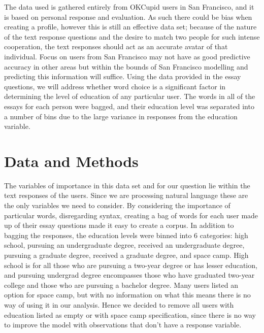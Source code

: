 \documentclass[a4paper,12pt]{article}
\begin{document}
The data used is gathered entirely from OKCupid users in San Francisco, and it is based on personal response and evaluation. As such there could be bias when creating a profile, however this is still an effective data set; because of the nature of the text response questions and the desire to match two people for such intense cooperation, the text responses should act as an accurate avatar of that individual. Focus on users from San Francisco may not have as good predictive accuracy in other areas but within the bounds of San Francisco modelling and predicting this information will suffice. Using the data provided in the essay questions, we will address whether word choice is a significant factor in determining the level of education of any particular user. The words in all of the essays for each person were bagged, and their education level was separated into a number of bins due to the large variance in responses from the education variable.



\section{Data and Methods}

The variables of importance in this data set and for our question lie within the text responses of the users. Since we are processing natural language these are the only variables we need to consider. By considering the importance of particular words, disregarding syntax, creating a bag of words for each user made up of their essay questions made it easy to create a corpus. In addition to bagging the responses, the education levels were binned into 6 categories: high school, pursuing an undergraduate degree, received an undergraduate degree, pursuing a graduate degree, received a graduate degree, and space camp. High school is for all those who are pursuing a two-year degree or has lesser education, and pursuing undergrad degree encompasses those who have graduated two-year college and those who are pursuing a bachelor degree. Many users listed an option for space camp, but with no information on what this means there is no way of using it in our analysis. Hence we decided to remove all users with education listed as empty or with space camp specification, since there is no way to improve the model with observations that don't have a response variable.
\end{document}

